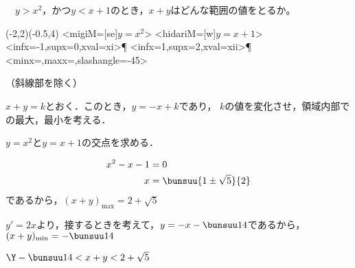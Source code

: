 \begin{problem}
　$y>x^2$，かつ$y<x+1$のとき，$x+y$はどんな範囲の値をとるか。
\end{problem}

\begin{center}
  \begin{pszahyou}[ul=10mm](-2,2)(-0.5,4)
  \YGraph<migiM=[se]{$y=x^2$}>{\Fx}
  \YGraph<hidariM=[w]{$y=x+1$}>{\Gx}
  \YandY<infx=-1,supx=0,xval=xi>\Fx\Gx\P
  \YandY<infx=1,supx=2,xval=xii>\Fx\Gx\P
  \YPaintii*<minx=\xi,maxx=\xii,slashangle=-45>\Fx\Gx
\end{pszahyou}

（斜線部を除く）
\end{center}


\vspace{1zw}

$x+y = k$とおく．このとき，$y = -x + k$であり，
$k$の値を変化させ，領域内部での最大，最小を考える．

$y = x^2$と$y = x+1$の交点を求める．

\begin{align*}
  x^2 - x - 1 &= 0\\
  x &= \bunsuu{1 \pm \sqrt5}{2}
\end{align*}
であるから，$(x+y)_{\mathrm{max}} = 2+\sqrt5$

$y' = 2x$より，接するときを考えて，$y = -x - \bunsuu14$であるから，
$(x+y)_{\mathrm{min}} = -\bunsuu14$

$\Y -\bunsuu14 < x + y < 2 + \sqrt5$
